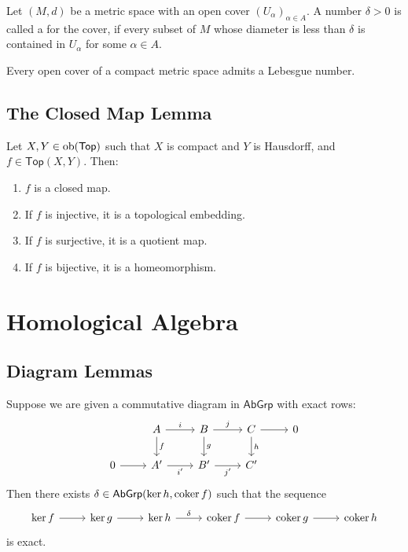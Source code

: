 \begin{definition}
	Let $(M,d)$ be a metric space with an open cover $(U_\alpha)_{\alpha \in A}$. A number $\delta > 0$ is called a  for the cover, if every subset of $M$ whose diameter is less than $\delta$ is contained in $U_\alpha$ for some $\alpha \in A$.
\end{definition}

\begin{lemma}
	\label{lem:Lebesgue_number_lemma}
	Every open cover of a compact metric space admits a Lebesgue number.	
\end{lemma}

\subsection*{The Closed Map Lemma}

\begin{lemma}
	Let $X,Y \in \operatorname{ob}(\mathsf{Top})$ such that $X$ is compact and $Y$ is Hausdorff, and $f \in \mathsf{Top}(X,Y)$. Then:
	\begin{enumerate}[label = \textup{(}\alph*\textup{)},wide = 0pt]
		\item $f$ is a closed map.
		\item If $f$ is injective, it is a topological embedding.
		\item If $f$ is surjective, it is a quotient map.
		\item If $f$ is bijective, it is a homeomorphism.
	\end{enumerate}
	\label{lem:closed_map_lemma}
\end{lemma}

\section*{Homological Algebra}
\subsection*{Diagram Lemmas}
\begin{proposition}
	Suppose we are given a commutative diagram in $\mathsf{AbGrp}$ with exact rows:
	\begin{equation*}
		\begin{tikzcd}
			& A \arrow[r,"i"]\arrow[d,"f"] & B \arrow[r,"j"]\arrow[d,"g"] & C \arrow[r]\arrow[d,"h"] & 0\\
			0 \arrow[r] & A' \arrow[r,"i'"'] & B' \arrow[r,"j'"'] & C'
		\end{tikzcd}
	\end{equation*}
	Then there exists $\delta \in \mathsf{AbGrp}(\ker h,\operatorname{coker} f)$ such that the sequence
	\begin{equation}
		\begin{tikzcd}
			 \ker f \arrow[r] & \ker g \arrow[r] & \ker h \arrow[r,"\delta"] & \coker f \arrow[r] & \coker g \arrow[r] & \coker h
		 \end{tikzcd}
	\end{equation}
	\noindent is exact.
	\label{prop:snake_lemma}
\end{proposition}

